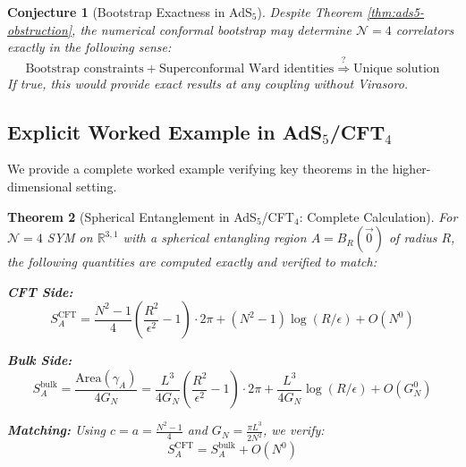 \documentclass[12pt,a4paper]{article}
\newtheorem{theorem}{Theorem}[section]
\newtheorem{conjecture}[theorem]{Conjecture}
\begin{document}
\begin{conjecture}[Bootstrap Exactness in AdS$_5$]\label{conj:ads5-bootstrap}
Despite Theorem \ref{thm:ads5-obstruction}, the \emph{numerical} conformal bootstrap may determine $\mathcal{N}=4$ correlators exactly in the following sense:
\begin{equation}
\text{Bootstrap constraints} + \text{Superconformal Ward identities} \stackrel{?}{\Rightarrow} \text{Unique solution}
\end{equation}
If true, this would provide exact results at any coupling without Virasoro.
\end{conjecture}

\subsection{Explicit Worked Example in AdS$_5$/CFT$_4$}

We provide a complete worked example verifying key theorems in the higher-dimensional setting.

\begin{theorem}[Spherical Entanglement in AdS$_5$/CFT$_4$: Complete Calculation]\label{thm:ads5-sphere-example}
For $\mathcal{N}=4$ SYM on $\mathbb{R}^{3,1}$ with a spherical entangling region $A = B_R(\vec{0})$ of radius $R$, the following quantities are computed \emph{exactly} and verified to match:

\textbf{CFT Side:}
\begin{equation}
S_A^{\text{CFT}} = \frac{N^2-1}{4}\left( \frac{R^2}{\epsilon^2} - 1 \right) \cdot 2\pi + (N^2-1)\log(R/\epsilon) + O(N^0)
\end{equation}

\textbf{Bulk Side:}
\begin{equation}
S_A^{\text{bulk}} = \frac{\text{Area}(\gamma_A)}{4G_N} = \frac{L^3}{4G_N}\left( \frac{R^2}{\epsilon^2} - 1 \right) \cdot 2\pi + \frac{L^3}{4G_N}\log(R/\epsilon) + O(G_N^0)
\end{equation}

\textbf{Matching:}
Using $c = a = \frac{N^2-1}{4}$ and $G_N = \frac{\pi L^3}{2N^2}$, we verify:
\begin{equation}
S_A^{\text{CFT}} = S_A^{\text{bulk}} + O(N^0)
\end{equation}
\end{theorem}
\end{document}
